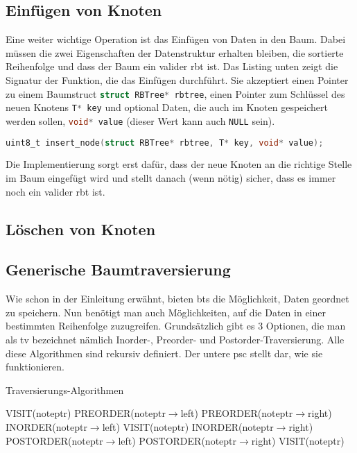 \documentclass[11pt]{article}
\newcommand{\lstin}[1]{\lstinline[language=C]{#1}}
\begin{document}
\subsection{Einfügen von Knoten}
Eine weiter wichtige Operation ist das Einfügen von Daten in den Baum. Dabei müssen die zwei Eigenschaften der Datenstruktur erhalten bleiben, die sortierte Reihenfolge und dass der Baum ein valider \gls{rbt} ist.
Das Listing unten zeigt die Signatur der Funktion, die das Einfügen durchführt. Sie akzeptiert einen Pointer zu einem Baumstruct \lstin{struct RBTree* rbtree}, einen Pointer zum Schlüssel des neuen Knotens \lstin{T* key} und optional Daten, die auch im Knoten gespeichert werden sollen, \lstin{void* value} (dieser Wert kann auch \lstin{NULL} sein). 

\begin{lstlisting}[language=C]
uint8_t insert_node(struct RBTree* rbtree, T* key, void* value);
\end{lstlisting}

Die Implementierung sorgt erst dafür, dass der neue Knoten an die richtige Stelle im Baum eingefügt wird und stellt danach (wenn nötig) sicher, dass es immer noch ein valider \gls{rbt} ist.



\subsection{Löschen von Knoten}

\pagebreak
\subsection{Generische Baumtraversierung} \label{tr}
Wie schon in der Einleitung erwähnt, bieten \glspl{bt} die Möglichkeit, Daten geordnet zu speichern. Nun benötigt man auch Möglichkeiten, auf die Daten in einer bestimmten Reihenfolge zuzugreifen. Grundsätzlich gibt es 3 Optionen, die man als \gls{tv} bezeichnet nämlich Inorder-, Preorder- und Postorder-Traversierung.
Alle diese Algorithmen sind rekursiv definiert. \cite[S. 44ff]{aic}  Der untere \gls{psc} stellt dar, wie sie funktionieren. 

\begin{algorithm}
  \caption{Traversierungs-Algorithmen}
  \begin{algorithmic}[1]  
      \Return
    \EndIf
    \State VISIT(noteptr)
    \State PREORDER(noteptr$\rightarrow$left)
    \State PREORDER(noteptr$\rightarrow$right)
  \EndProcedure
      \Return
    \EndIf
    \State INORDER(noteptr$\rightarrow$left)
    \State VISIT(noteptr)
    \State INORDER(noteptr$\rightarrow$right)
  \EndProcedure
      \Return
    \EndIf
    \State POSTORDER(noteptr$\rightarrow$left)
    \State POSTORDER(noteptr$\rightarrow$right)
    \State VISIT(noteptr)  
  \EndProcedure
  \end{algorithmic}
\end{algorithm}
\cite[S. 318ff]{aop}
\end{document}
